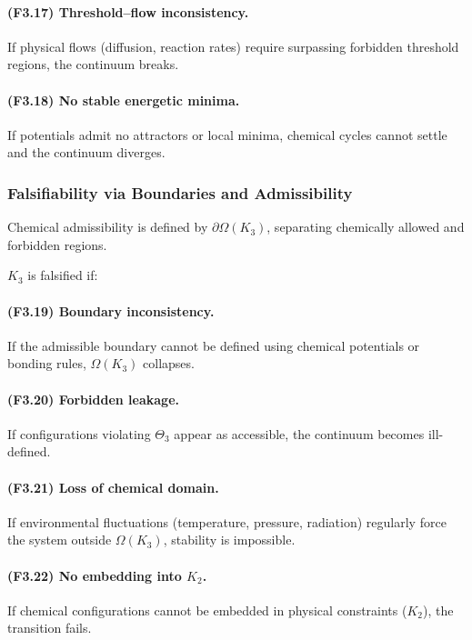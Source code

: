 \paragraph{(F3.17) Threshold–flow inconsistency.}
If physical flows (diffusion, reaction rates) require surpassing
forbidden threshold regions, the continuum breaks.

\paragraph{(F3.18) No stable energetic minima.}
If potentials admit no attractors or local minima,
chemical cycles cannot settle and the continuum diverges.



\subsubsection{Falsifiability via Boundaries and Admissibility}

Chemical admissibility is defined by $\partial\Omega(K_3)$, separating
chemically allowed and forbidden regions.

$K_3$ is falsified if:

\paragraph{(F3.19) Boundary inconsistency.}
If the admissible boundary cannot be defined using chemical potentials
or bonding rules, $\Omega(K_3)$ collapses.

\paragraph{(F3.20) Forbidden leakage.}
If configurations violating $\Theta_3$ appear as accessible, the
continuum becomes ill-defined.

\paragraph{(F3.21) Loss of chemical domain.}
If environmental fluctuations (temperature, pressure, radiation)
regularly force the system outside $\Omega(K_3)$, stability is
impossible.

\paragraph{(F3.22) No embedding into \texorpdfstring{$K_2$}{K_2}.}
If chemical configurations cannot be embedded in physical constraints
($K_2$), the transition fails.




